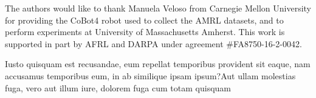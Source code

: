 \documentclass[letterpaper]{article} %
\theoremstyle{definition}
\begin{document}
The authors would like to thank Manuela Veloso from
Carnegie Mellon University for providing the CoBot4 robot
used to collect the AMRL datasets, and to perform experiments
at University of Massachusetts Amherst. This work is supported in part by AFRL
and DARPA under agreement \#FA8750-16-2-0042.

Iusto quisquam est recusandae, eum repellat temporibus provident sit eaque, nam accusamus temporibus eum, in ab similique ipsam ipsum?Aut ullam molestias fuga, vero aut illum iure, dolorem fuga cum totam quisquam


\end{document}
